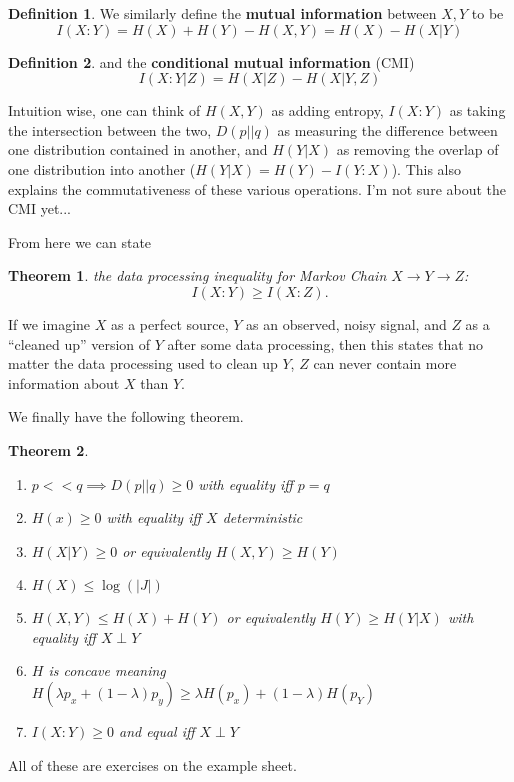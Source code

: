 \documentclass{article}
\newtheorem{theorem}{Theorem}
\theoremstyle{definition}
\newtheorem{definition}{Definition}
\begin{document}
\begin{definition}
We similarly define the \textbf{mutual information} between $X, Y$ to be
\begin{equation}
I(X : Y) = H(X) + H(Y) - H(X, Y) = H(X) - H(X | Y)
\end{equation}
\end{definition}

\begin{definition}
and the \textbf{conditional mutual information} (CMI)
\begin{equation}
I(X : Y | Z) = H(X | Z) - H(X | Y, Z)
\end{equation}
\end{definition}

Intuition wise, one can think of $H(X, Y)$ as adding entropy, $I(X:Y)$ as taking
the intersection between the two, $D(p || q)$ as measuring the difference
between one distribution contained in another, and $H(Y|X)$ as removing the
overlap of one distribution into another ($H(Y | X) = H(Y) - I(Y : X)$). This
also explains the commutativeness of these various operations. I'm not sure
about the CMI yet...

From here we can state

\begin{theorem}
the data processing inequality for Markov Chain $X \to Y \to Z$:
\begin{equation}
I(X : Y) \geq I(X : Z).
\end{equation}
\end{theorem}

If we imagine $X$ as a perfect source, $Y$ as an observed, noisy signal, and $Z$
as a ``cleaned up'' version of $Y$ after some data processing, then this states
that no matter the data processing used to clean up $Y$, $Z$ can never contain
more information about $X$ than $Y$.

We finally have the following theorem.

\begin{theorem}
\begin{enumerate}
\item $p << q \implies D(p || q) \geq 0$ with equality iff $p = q$
\item $H(x) \geq 0$ with equality iff $X$ deterministic
\item $H(X | Y) \geq 0$ or equivalently $H(X, Y) \geq H(Y)$
\item $H(X) \leq \log(|J|)$
\item $H(X, Y) \leq H(X) + H(Y)$ or equivalently $H(Y) \geq H(Y | X)$ with
equality iff $X \perp Y$
\item $H$ is concave meaning $H(\lambda p_x + (1 - \lambda) p_y) \geq
 \lambda H(p_x) + (1 - \lambda) H(p_Y)$
\item $I(X : Y) \geq 0$ and equal iff $X \perp Y$
\end{enumerate}
\end{theorem}

All of these are exercises on the example sheet.
\end{document}
